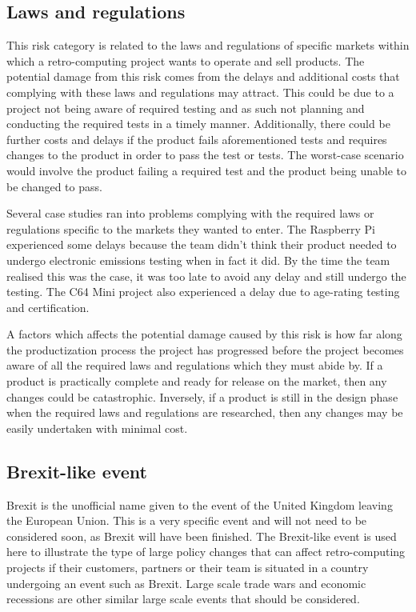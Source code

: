 \subsection{Laws and regulations}
This risk category is related to the laws and regulations of specific markets within which a retro-computing project wants to operate and sell products. The potential damage from this risk comes from the delays and additional costs that complying with these laws and regulations may attract. This could be due to a project not being aware of required testing and as such not planning and conducting the required tests in a timely manner. Additionally, there could be further costs and delays if the product fails aforementioned tests and requires changes to the product in order to pass the test or tests. The worst-case scenario would involve the product failing a required test and the product being unable to be changed to pass. 

Several case studies ran into problems complying with the required laws or regulations specific to the markets they wanted to enter. The Raspberry Pi experienced some delays because the team didn't think their product needed to undergo electronic emissions testing when in fact it did. By the time the team realised this was the case, it was too late to avoid any delay and still undergo the testing. The C64 Mini project also experienced a delay due to age-rating testing and certification.  

A factors which affects the potential damage caused by this risk is how far along the productization process the project has progressed before the project becomes aware of all the required laws and regulations which they must abide by. If a product is practically complete and ready for release on the market, then any changes could be catastrophic. Inversely, if a product is still in the design phase when the required laws and regulations are researched, then any changes may be easily undertaken with minimal cost.

\subsection{Brexit-like event}
Brexit is the unofficial name given to the event of the United Kingdom leaving the European Union. This is a very specific event and will not need to be considered soon, as Brexit will have been finished. The Brexit-like event is used here to illustrate the type of large policy changes that can affect retro-computing projects if their customers, partners or their team is situated in a country undergoing an event such as Brexit. Large scale trade wars and economic recessions are other similar large scale events that should be considered. 

